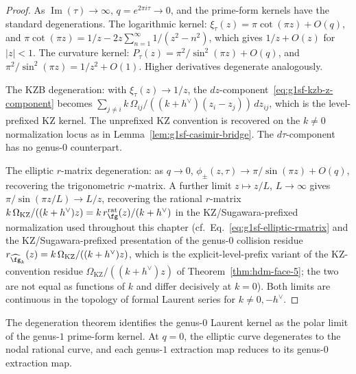 \begin{proof}
As $\operatorname{Im}(\tau) \to \infty$, $q = e^{2\pi i\tau} \to 0$,
and the prime-form kernels have the standard degenerations. The
logarithmic kernel: $\xi_\tau(z) = \pi\cot(\pi z) + O(q)$, and
$\pi\cot(\pi z) = 1/z - 2z\sum_{n=1}^\infty 1/(z^2 - n^2)$, which
gives $1/z + O(z)$ for $|z| < 1$. The curvature kernel:
$P_\tau(z) = \pi^2/\sin^2(\pi z) + O(q)$,
and $\pi^2/\sin^2(\pi z) = 1/z^2 + O(1)$. Higher derivatives
degenerate analogously.

The KZB degeneration: with $\xi_\tau(z) \to 1/z$, the
$dz$-component~\eqref{eq:g1sf-kzb-z-component} becomes
$\sum_{j \neq i}k\,\Omega_{ij}/((k+h^\vee)(z_i - z_j))\, dz_{ij}$,
which is the level-prefixed KZ kernel. The unprefixed KZ convention is
recovered on the $k\neq0$ normalization locus as in
Lemma~\ref{lem:g1sf-casimir-bridge}. The $d\tau$-component has no
genus-$0$ counterpart.

The elliptic $r$-matrix degeneration: as $q \to 0$,
$\phi_\pm(z, \tau) \to \pi/\sin(\pi z) + O(q)$, recovering the
trigonometric $r$-matrix. A further limit $z \mapsto z/L$,
$L \to \infty$ gives $\pi/\sin(\pi z/L) \to L/z$, recovering the
rational $r$-matrix
$k\,\Omega_{\mathrm{KZ}}/((k+h^\vee)z) = k\,r^{\mathrm{rat}}_\fg(z)/(k+h^\vee)$
in the KZ/Sugawara-prefixed normalization used throughout this chapter
\textup{(}cf.\ Eq.~\eqref{eq:g1sf-elliptic-rmatrix} and the
KZ/Sugawara-prefixed presentation of the genus-$0$ collision residue
$r_{\widehat{\fg}_k}(z) = k\,\Omega_{\mathrm{KZ}}/((k+h^\vee)z)$,
which is the explicit-level-prefix variant of the KZ-convention
residue $\Omega_{\mathrm{KZ}}/((k+h^\vee)z)$ of
Theorem~\ref{thm:hdm-face-5}; the two are not equal as functions of
$k$ and differ decisively at $k = 0$\textup{)}.
Both limits are continuous in the topology of formal Laurent series
for $k \neq 0, -h^\vee$.
\end{proof}

The degeneration theorem identifies the genus-$0$ Laurent kernel as
the polar limit of the genus-$1$ prime-form kernel. At $q=0$, the
elliptic curve degenerates to the nodal rational curve, and each
genus-$1$ extraction map reduces to its genus-$0$ extraction map.



